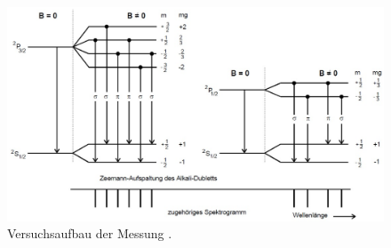 \vspace{-5pt}
\begin{figure}[H]
    \centering
    \includegraphics[scale=0.3]{content/anormalerzeeman.png}
    \caption{Versuchsaufbau der Messung \cite{alt}.}
    \label{fig:anorm}
\end{figure}

















